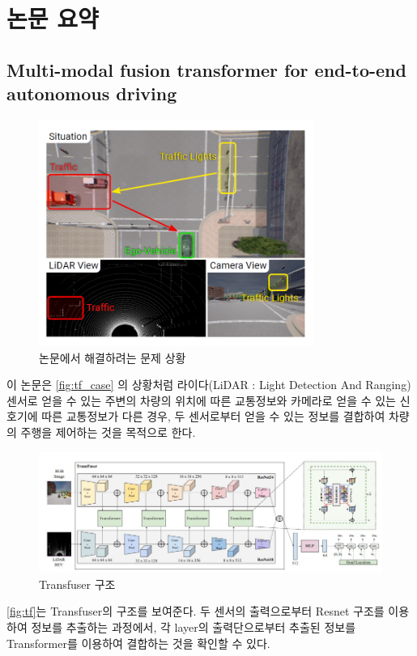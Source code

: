 \section{논문 요약}{\label{sec:review}}

\subsection{Multi-modal fusion transformer for end-to-end autonomous driving}{\label{subsec:Transfuser}}
\begin{figure}[htp]
    \centering
    \includegraphics[width=0.8\textwidth]{figures/Transfuser_case.png}
    \caption{논문에서 해결하려는 문제 상황}
    \label{fig:tf_case}
\end{figure}
이 논문은 \autoref{fig:tf_case} 의 상황처럼
라이다(LiDAR : Light Detection And Ranging) 센서로 얻을 수 있는 주변의 차량의 위치에 따른 교통정보와
카메라로 얻을 수 있는 신호기에 따른 교통정보가 다른 경우,
두 센서로부터 얻을 수 있는 정보를 결합하여 차량의 주행을 제어하는 것을 목적으로 한다.
\begin{figure}[htp]
    \centering
    \includegraphics[width=\textwidth]{figures/Transfuser.png}
    \caption{Transfuser 구조}
    \label{fig:tf}
\end{figure}
\autoref{fig:tf}는 Transfuser의 구조를 보여준다.
두 센서의 출력으로부터 Resnet 구조\cite{Resnet}를 이용하여 정보를 추출하는 과정에서,
각 layer의 출력단으로부터 추출된 정보를 Transformer\cite{Transformer}를 이용하여 결합하는 것을 확인할 수 있다.

